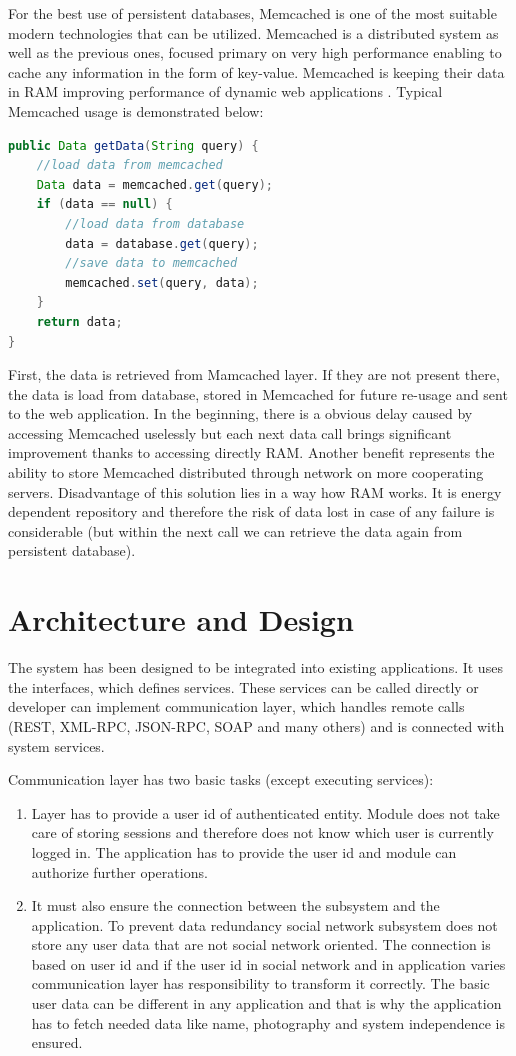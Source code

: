 \documentclass{llncs}
\begin{document}
For the best use of persistent databases, Memcached is one of the most
suitable modern technologies that can be utilized. Memcached is a distributed
system as well as the previous ones, focused primary on very high performance
enabling to cache any information in the form of key-value. Memcached is
keeping their data in RAM improving performance of dynamic web applications
\cite{memcached}. Typical Memcached usage is demonstrated below:
\begin{lstlisting}[language=Java]
public Data getData(String query) {
	//load data from memcached
	Data data = memcached.get(query);
	if (data == null) {
		//load data from database
		data = database.get(query);
		//save data to memcached
		memcached.set(query, data);
	}
	return data;
}
\end{lstlisting}

First, the data is retrieved from Mamcached layer. If they are not present
there, the data is load from database, stored in Memcached for future re-usage
and sent to the web application. In the beginning, there is a obvious delay
caused by accessing Memcached uselessly but each next data call brings
significant improvement thanks to accessing directly RAM. Another benefit
represents the ability to store Memcached distributed through network on more
cooperating servers.  Disadvantage of this solution lies in a way how RAM
works. It is energy dependent repository and therefore the risk of data lost in
case of any failure is considerable (but within the next call we can retrieve
the data again from persistent database).

\section{Architecture and Design}
The system has been designed to be integrated into existing applications. It
uses the interfaces, which defines services. These services can be called
directly or developer can implement communication layer, which handles remote
calls (REST, XML-RPC, JSON-RPC, SOAP and many others) and is connected with
system services.

Communication layer has two basic tasks (except executing services):
\begin{enumerate}
\item Layer has to provide a user id of authenticated entity. Module does not
take care of storing sessions and therefore does not know which user is
currently logged in. The application has to provide the user id and module
can authorize further operations.
\item It must also ensure the connection between the subsystem and the
application. To prevent data redundancy social network subsystem does not
store any user data that are not social network oriented. The connection is
based on user id and if the user id in social network and in application
varies communication layer has responsibility to transform it correctly.  The
basic user data can be different in any application and that is why the
application has to fetch needed data like name, photography and system
independence is ensured.
\end{enumerate}
\end{document}
